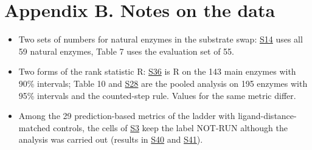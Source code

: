 \documentclass[
  10pt,
]{article}
\providecommand{\tightlist}{%
  \setlength{\itemsep}{0pt}\setlength{\parskip}{0pt}}
\DeclareRobustCommand{\_}{\textunderscore\hspace{0pt}}
\begin{document}
\section{Appendix B.
Notes on the data}

\begin{itemize}
\tightlist
\item
  Two sets of
  numbers for
  natural enzymes in
  the substrate
  swap:
  \protect\hyperlink{S14}{S14}
  uses all 59
  natural enzymes,
  Table 7 uses the
  evaluation set of
  55.
\item
  Two forms of the
  rank statistic R:
  \protect\hyperlink{S36}{S36}
  is R on the 143
  main enzymes with
  90\% intervals;
  Table 10 and
  \protect\hyperlink{S28}{S28}
  are the pooled
  analysis on 195
  enzymes with 95\%
  intervals and the
  counted-step rule.
  Values for the
  same metric
  differ.
\item
  Among the 29
  prediction-based
  metrics of the
  ladder with
  ligand-distance-matched
  controls, the
  cells of
  \protect\hyperlink{S3}{S3}
  keep the label
  NOT-RUN although
  the analysis was
  carried out
  (results in
  \protect\hyperlink{S40}{S40}
  and
  \protect\hyperlink{S41}{S41}).
\end{itemize}
\end{document}
